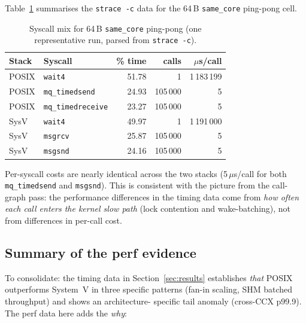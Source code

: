 \documentclass[a4paper,11pt]{article}
\begin{document}
Table~\ref{tab:strace} summarises the \texttt{strace -c} data for the
64\,B \texttt{same\_core} ping-pong cell.

\begin{table}[H]
\centering
\caption{Syscall mix for 64\,B \texttt{same\_core} ping-pong (one
representative run, parsed from \texttt{strace -c}).}
\label{tab:strace}
\begin{tabular}{llrrr}
\toprule
\textbf{Stack} & \textbf{Syscall}      & \textbf{\% time} & \textbf{calls} & \textbf{$\mu$s/call} \\
\midrule
POSIX & \texttt{wait4}          & 51.78 & 1       & 1\,183\,199 \\
POSIX & \texttt{mq\_timedsend}  & 24.93 & 105\,000 & 5 \\
POSIX & \texttt{mq\_timedreceive} & 23.27 & 105\,000 & 5 \\
\midrule
SysV  & \texttt{wait4}          & 49.97 & 1       & 1\,191\,000 \\
SysV  & \texttt{msgrcv}         & 25.87 & 105\,000 & 5 \\
SysV  & \texttt{msgsnd}         & 24.16 & 105\,000 & 5 \\
\bottomrule
\end{tabular}
\end{table}

Per-syscall costs are nearly identical across the two stacks
(5\,$\mu$s/call for both \texttt{mq\_timedsend} and \texttt{msgsnd}).
This is consistent with the picture from the call-graph pass: the
performance differences in the timing data come from \emph{how often
each call enters the kernel slow path} (lock contention and
wake-batching), not from differences in per-call cost.

\subsection{Summary of the perf evidence}
\label{sec:perf:summary}

To consolidate: the timing data in Section~\ref{sec:results} establishes
\emph{that} POSIX outperforms System~V in three specific patterns
(fan-in scaling, SHM batched throughput) and shows an architecture-
specific tail anomaly (cross-CCX p99.9). The perf data here adds the
\emph{why}:
\end{document}
